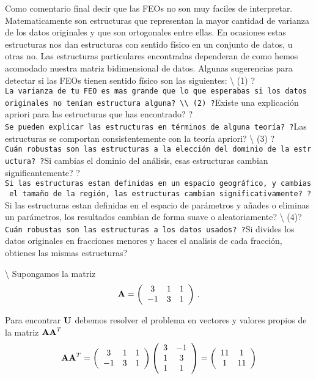 \documentclass[
]{agujournal2019}
\begin{document}
Como comentario final decir que las FEOs no son muy faciles de
interpretar. Matematicamente son estructuras que representan la mayor
cantidad de varianza de los datos originales y que son ortogonales entre
ellas. En ocasiones estas estructuras nos dan estructuras con sentido
físico en un conjunto de datos, u otras no. Las estructuras particulares
encontradas dependeran de como hemos acomodado nuestra matriz
bidimensional de datos. Algunas sugerencias para detectar si las FEOs
tienen sentido físico son las siguientes: \textbackslash{} (1)
?\texttt{La\ varianza\ de\ tu\ FEO\ es\ mas\ grande\ que\ lo\ que\ esperabas\ si\ los\ datos\ originales\ no\ tenían\ estructura\ alguna?\ \textbackslash{}\textbackslash{}\ (2)\ ?}Existe
una explicación apriori para las estructuras que has encontrado?
?\texttt{Se\ pueden\ explicar\ las\ estructuras\ en\ términos\ de\ alguna\ teoría?\ ?}Las
estructuras se comportan consistentemente con la teoría apriori?
\textbackslash{} (3)
?\texttt{Cuán\ robustas\ son\ las\ estructuras\ a\ la\ elección\ del\ dominio\ de\ la\ estructura?\ ?}Si
cambias el dominio del análisis, esas estructuras cambian
significantemente?
?\texttt{Si\ las\ estructuras\ estan\ definidas\ en\ un\ espacio\ geográfico,\ y\ cambias\ el\ tamaño\ de\ la\ región,\ las\ estructuras\ cambian\ significativamente?\ ?}Si
las estructuras estan definidas en el espacio de parámetros y añades o
eliminas un parámetros, los resultados cambian de forma suave o
aleatoriamente? \textbackslash{}
(4)?\texttt{Cuán\ robustas\ son\ las\ estructuras\ a\ los\ datos\ usados?\ ?}Si
divides los datos originales en fracciones menores y haces el analisis
de cada fracción, obtienes las mismas estructuras?

\vspace{0.5cm}

\textbackslash{} \noindent Supongamos la matriz
\[{\textbf A}=\left(\begin{array}{ccc}
  3 & 1 & 1\\
  -1 & 3 & 1\\
      \end{array}\right)\,.\]

Para encontrar \({\textbf U}\) debemos resolver el problema en vectores
y valores propios de la matriz \({\textbf A}{\textbf A}^T\)
\[{\textbf A}{\textbf A}^T=\left(\begin{array}{ccc}
  3 & 1 & 1\\
  -1 & 3 & 1\\
      \end{array}\right)
      \left(\begin{array}{ccc}
  3 & -1 \\
  1 & 3 \\
  1 & 1 \\
      \end{array}\right)=\left(\begin{array}{cc}
  11 & 1 \\
  1 & 11 \\
      \end{array}\right)\]
\end{document}
